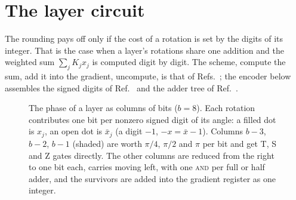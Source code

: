 \documentclass[aps,prx,twocolumn,superscriptaddress,nofootinbib,longbibliography]{revtex4-2}
\theoremstyle{remark}
\newcommand{\AND}{\textup{\textsc{and}}}
\begin{document}
\section{The layer circuit}\label{sec:layer}

The rounding pays off only if the cost of a rotation is set by the digits of its integer. That
is the case when a layer's rotations share one addition and the weighted sum
$\sum_jK_jx_j$ is computed digit by digit. The scheme, compute the sum, add it into the gradient,
uncompute, is that of Refs.~\cite{Sanders2020,Wu2026}; the encoder below assembles the signed
digits of Ref.~\cite{Sanders2020} and the adder tree of Ref.~\cite{Gidney2018}.

\begin{figure}[t]
\centering
{}
\caption{The phase of a layer as columns of bits ($b=8$). Each rotation contributes one bit per
nonzero signed digit of its angle: a filled dot is $x_j$, an open dot is $\bar x_j$ (a digit
$-1$, $-x=\bar x-1$). Columns $b-3$, $b-2$, $b-1$ (shaded) are worth $\pi/4$, $\pi/2$ and
$\pi$ per bit and get T, S and Z gates directly. The other columns are reduced from the right
to one bit each, carries moving left, with one \AND{} per full or half adder, and the
survivors are added into the gradient register as one integer.}
\label{fig:columns}
\end{figure}
\end{document}
